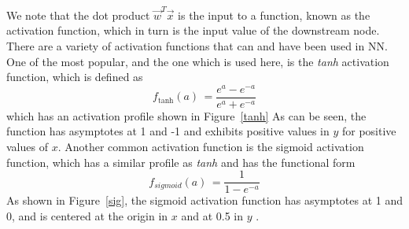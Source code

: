 \documentclass[letterpaper,12pt]{article}
\newcommand{\figref}[1]{Figure~\ref{#1}}
\begin{document}
We note that the dot product $\vec{w}^T\vec{x}$ is the input to a function, known as the activation function, which in turn is the input value of the downstream node. There are a variety of activation functions that can and have been used in NN. One of the most popular, and the one which is used here, is the \textit{tanh} activation function, which is defined as
\begin{equation}
f_{\text{tanh}}(a) \, = \frac{e^a-e^{-a}}{e^a+e^{-a}}
\end{equation}
which has an activation profile shown in \figref{tanh} As can be seen, the function has asymptotes  at 1 and -1 and exhibits positive values in $y$ for positive values of $x$. Another common activation function is the sigmoid activation function, which has a similar profile as \textit{tanh} and has the functional form
\begin{equation}
f_{sigmoid}(a) \, = \frac{1}{1-e^{-a}}
\end{equation}
As shown in \figref{sig}, the sigmoid activation function has asymptotes at 1 and 0, and is centered at the origin in $x$ and at 0.5 in $y$ \cite{GoogLeNet}. 
\end{document}
